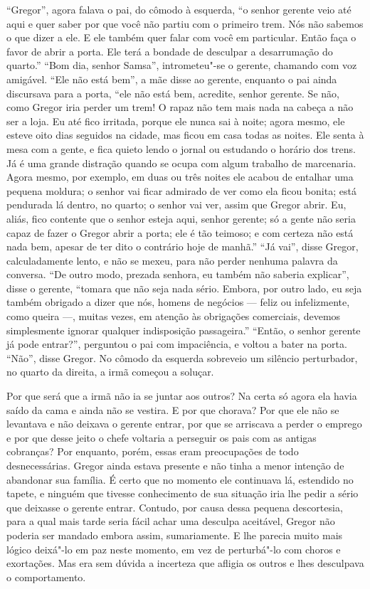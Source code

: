 “Gregor”, agora falava o pai, do cômodo à esquerda, “o senhor gerente veio
até aqui e quer saber por que você não partiu com o primeiro trem. Nós não
sabemos o que dizer a ele. E ele também quer falar com você em particular.
Então faça o favor de abrir a porta. Ele terá a bondade de desculpar a
desarrumação do quarto.” “Bom dia, senhor Samsa”, intrometeu"-se o gerente,
chamando com voz amigável. “Ele não está bem”, a mãe disse ao gerente,
enquanto o pai ainda discursava para a porta, “ele não está bem, acredite,
senhor gerente. Se não, como Gregor iria perder um trem! O rapaz não tem
mais nada na cabeça a não ser a loja. Eu até fico irritada, porque ele
nunca sai à noite; agora mesmo, ele esteve oito dias seguidos na cidade,
mas ficou em casa todas as noites. Ele senta à mesa com a gente, e fica
quieto lendo o jornal ou estudando o horário dos trens. Já é uma grande
distração quando se ocupa com algum trabalho de marcenaria. Agora mesmo,
por exemplo, em duas ou três noites ele acabou de entalhar uma pequena
moldura; o senhor vai ficar admirado de ver como ela ficou bonita; está
pendurada lá dentro, no quarto; o senhor vai ver, assim que Gregor abrir.
Eu, aliás, fico contente que o senhor esteja aqui, senhor gerente; só a
gente não seria capaz de fazer o Gregor abrir a porta; ele é tão teimoso;
e com certeza não está nada bem, apesar de ter dito o contrário hoje de
manhã.” “Já vai”, disse Gregor, calculadamente lento, e não se mexeu, para
não perder nenhuma palavra da conversa. “De outro modo, prezada senhora,
eu também não saberia explicar”, disse o gerente, “tomara que não seja
nada sério. Embora, por outro lado, eu seja também obrigado a dizer que
nós, homens de negócios --- feliz ou infelizmente, como queira ---, muitas
vezes, em atenção às obrigações comerciais, devemos simplesmente ignorar
qualquer indisposição passageira.” “Então, o senhor gerente já pode
entrar?”, perguntou o pai com impaciência, e voltou a bater na porta.
“Não”, disse Gregor. No cômodo da esquerda sobreveio um silêncio
perturbador, no quarto da direita, a irmã começou a soluçar.

Por que será que a irmã não ia se juntar aos outros? Na certa só agora ela
havia saído da cama e ainda não se vestira. E por que chorava? Por que ele
não se levantava e não deixava o gerente entrar, por que se arriscava a
perder o emprego e por que desse jeito o chefe voltaria a perseguir os pais
com as antigas cobranças? Por enquanto, porém, essas eram preocupações de
todo desnecessárias. Gregor ainda estava presente e não tinha a menor
intenção de abandonar sua família. É certo que no momento ele continuava
lá, estendido no tapete, e ninguém que tivesse conhecimento de sua
situação iria lhe pedir a sério que deixasse o gerente entrar. Contudo,
por causa dessa pequena descortesia, para a qual mais tarde seria fácil
achar uma desculpa aceitável, Gregor não poderia ser mandado embora assim,
sumariamente. E lhe parecia muito mais lógico deixá"-lo em paz
neste momento, em vez de perturbá"-lo com choros e exortações. Mas era sem
dúvida a incerteza que afligia os outros e lhes desculpava o
comportamento.

